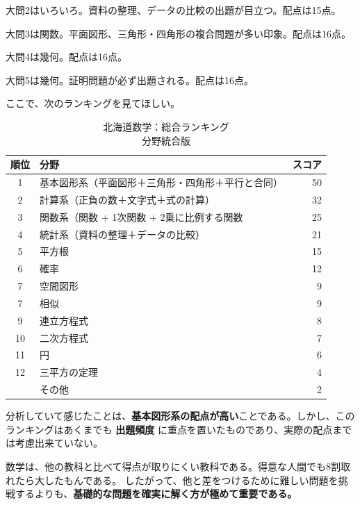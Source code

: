 大問2はいろいろ。資料の整理、データの比較の出題が目立つ。配点は15点。

大問3は関数。平面図形、三角形・四角形の複合問題が多い印象。配点は16点。

大問4は幾何。配点は16点。

大問5は幾何。証明問題が必ず出題される。配点は16点。
\vspace{0.5em}

ここで、次のランキングを見てほしい。
\vspace{0.5em}

    \begin{table}[htbp]
        \centering
        \caption{北海道数学：総合ランキング \\ 分野統合版}
        \begin{tabular}{c l r}
        \hline
        \textbf{順位} & \textbf{分野} & \textbf{スコア} \\
        \hline
        1 & 基本図形系（平面図形＋三角形・四角形＋平行と合同） & 50 \\
        2 & 計算系（正負の数＋文字式＋式の計算）& 32 \\
        3 & 関数系（関数 + 1次関数 + 2乗に比例する関数 & 25 \\
        4 & 統計系（資料の整理＋データの比較）& 21 \\
        5 & 平方根 & 15 \\
        6 & 確率 & 12 \\
        7 & 空間図形 & 9 \\
        7 & 相似 & 9 \\
        9 & 連立方程式 & 8 \\
        10 & 二次方程式 & 7 \\
        11 & 円 & 6 \\
        12 & 三平方の定理 & 4 \\
        & その他 & 2 \\
        \hline
        \end{tabular}
    \end{table}


分析していて感じたことは、\textbf{基本図形系の配点が高い}ことである。しかし、このランキングはあくまでも
\textbf{出題頻度} に重点を置いたものであり、実際の配点までは考慮出来ていない。

数学は、他の教科と比べて得点が取りにくい教科である。得意な人間でも8割取れたら大したもんである。
したがって、他と差をつけるために難しい問題を挑戦するよりも、\textbf{基礎的な問題を確実に解く方が極めて重要である。}
\newpage

